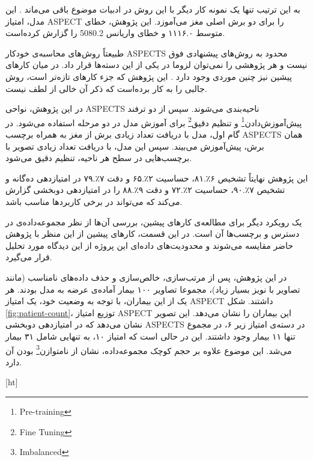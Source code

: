 به این ترتیب تنها یک نمونه کار دیگر با این روش در ادبیات موضوع باقی می‌ماند \cite{jung2018evaluating}.
این مدل، امتیاز ASPECT را برای دو برش اصلی مغز می‌آموزد.
این پژوهش، خطای متوسط ۱۱۱۶.۰ و خطای واریانس 5080.2 را گزارش کرده‌است.

طبیعتاً روش‌های محاسبه‌ی خودکار ASPECTS محدود به روش‌های پیشنهادی فوق نیست
و هر پژوهشی را نمی‌توان لزوما در یکی از این دسته‌ها قرار داد.
در میان کارهای پیشین نیز چنین موردی وجود دارد \cite{chen2022improving}.
این پژوهش که جزء کار‌های تازه‌تر است، روش جالبی را به کار برده‌است که ذکر آن خالی از لطف نیست.

در این پژوهش، نواحی ASPECTS ناحیه‌بندی می‌شوند.
سپس از دو ترفند 
پیش‌آموزش‌دادن\footnote{Pre-training}
و 
تنظیم دقیق\footnote{Fine Tuning}
برای آموزش مدل در دو مرحله استفاده می‌شود.
در گام اول، مدل با دریافت تعداد زیادی برش از مغز به همراه برچسب ASPECTS همان برش، پیش‌آموزش می‌بیند.
سپس این مدل، با دریافت تعداد زیادی تصویر با برچسب‌هایی در سطح هر ناحیه، تنظیم دقیق می‌شود.

این پژوهش نهایتاً تشخیص
۶٪.۸۱،
حساسیت
۲٪.۶۵
و دقت 
۷٪.۷۹
در امتیازدهی ده‌گانه و 
تشخیص
۷٪.۹۰،
حساسیت
۲٪.۷۲
و دقت 
۹٪.۸۸
را
در امتیازدهی دوبخشی 
گزارش می‌کند که می‌تواند در برخی کاربرد‌ها مناسب باشد.

یک رویکرد دیگر برای مطالعه‌ی کارهای پیشین، بررسی آن‌ها از نظر مجموعه‌داده‌ی در دسترس و برچسب‌ها آن است.
در این قسمت، کارهای پیشین از این منظر با پژوهش حاضر مقایسه می‌شوند
و
محدودیت‌های داده‌ای این پروژه از این دیدگاه مورد تحلیل قرار می‌گیرد.

در این پژوهش، پس از مرتب‌سازی، خالص‌سازی و حذف داده‌های نامناسب (مانند تصاویر با نویز بسیار زیاد)، مجموعا تصاویر ۱۰۰ بیمار آماده‌ی عرضه به مدل بودند.
هر یک از این بیماران، با توجه به وضعیت خود، یک امتیاز ASPECT داشتند.
شکل \ref{fig:patient-count}، توزیع امتیاز ASPECT این بیماران را نشان می‌دهد.
این تصویر نشان می‌دهد که در امتیازدهی دوبخشی ASPECTS در دسته‌ی امتیاز زیر ۶، در مجموع تنها ۱۱ بیمار وجود داشتند.
این در حالی است که امتیاز ۱۰، به تنهایی شامل ۳۱ بیمار می‌شد.
این موضوع علاوه بر حجم کوچک مجموعه‌داده، نشان از 
نامتوازن\footnote{Imbalanced} 
بودن آن دارد.


[ht]

